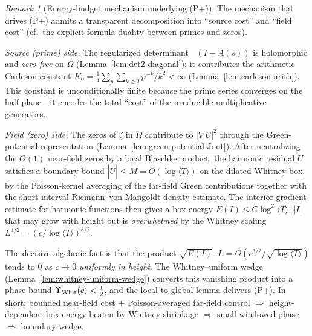 \documentclass[11pt]{amsart}
\theoremstyle{definition}
\theoremstyle{remark}
\newtheorem{remark}[theorem]{Remark}
\DeclareMathOperator{\dettwo}{det_2}
\newcommand{\angles}[1]{\langle #1\rangle}
\newcommand{\rsadd}[1]{{\color{violet}#1}}
\begin{document}
\rsadd{%
\begin{remark}[Energy-budget mechanism underlying \textup{(P+)}]\label{rem:energy-budget}
The mechanism that drives \textup{(P+)} admits a transparent decomposition into
``source cost'' and ``field cost'' (cf.\ the explicit-formula
duality between primes and zeros).

\emph{Source (prime) side.}
The regularized determinant $\dettwo(I-A(s))$ is holomorphic and \emph{zero-free}
on $\Omega$ (Lemma~\ref{lem:det2-diagonal}); it contributes the arithmetic
Carleson constant $K_0=\tfrac14\sum_{p}\sum_{k\ge 2}p^{-k}/k^2<\infty$
(Lemma~\ref{lem:carleson-arith}).
This constant is unconditionally finite because the prime series converges
on the half-plane---it encodes the total ``cost'' of the irreducible
multiplicative generators.

\emph{Field (zero) side.}
The zeros of $\zeta$ in $\Omega$ contribute to $|\nabla U|^2$ through
the Green-potential representation
(Lemma~\ref{lem:green-potential-Jout}).
After neutralizing the $O(1)$ near-field zeros by a local Blaschke product,
the harmonic residual $\widetilde U$ satisfies a boundary bound
$|\widetilde U|\le M=O(\log\angles{T})$ on the dilated Whitney box,
by the Poisson-kernel averaging of the far-field Green contributions
together with the short-interval Riemann--von Mangoldt density estimate.
The interior gradient estimate for harmonic functions then gives a
box energy $E(I)\le C\log^2\angles{T}\cdot|I|$ that may grow with height
but is \emph{overwhelmed} by the Whitney scaling $L^{3/2}=(c/\log\angles{T})^{3/2}$.

The decisive algebraic fact is that the product
$\sqrt{E(I)}\cdot L = O(c^{3/2}/\sqrt{\log\angles{T}})$
tends to $0$ as $c\to 0$ \emph{uniformly in height}.
The Whitney--uniform wedge (Lemma~\ref{lem:whitney-uniform-wedge})
converts this vanishing product into a phase bound
$\Upsilon_{\rm Whit}(c)<\tfrac12$,
and the local-to-global lemma delivers \textup{(P+)}.
In short: bounded near-field cost $+$ Poisson-averaged far-field control
$\Rightarrow$ height-dependent box energy beaten by Whitney shrinkage
$\Rightarrow$ small windowed phase
$\Rightarrow$ boundary wedge.
\end{remark}
}%
\end{document}

